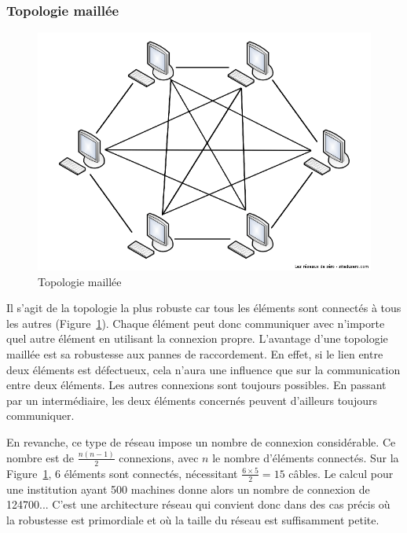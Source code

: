 \subsubsection{Topologie maillée}
\begin{figure}[h!]
  \centering
  \includegraphics[width=.4\textwidth]{images/topologies/topologieMaillee}
  \caption{Topologie maillée}
  \label{fig:topoMaillee}
\end{figure}

Il s'agit de la topologie la plus robuste car tous les éléments sont connectés à tous les autres (Figure~\ref{fig:topoMaillee}). Chaque élément peut donc communiquer avec n'importe quel autre élément en utilisant la connexion propre. L'avantage d'une topologie maillée est sa robustesse aux pannes de raccordement. En effet, si le lien entre deux éléments est défectueux, cela n'aura une influence que sur la communication entre deux éléments. Les autres connexions sont toujours possibles. En passant par un intermédiaire, les deux éléments concernés peuvent d'ailleurs toujours communiquer.

En revanche, ce type de réseau impose un nombre de connexion considérable. Ce nombre est de $\frac{n(n-1)}{2}$ connexions, avec $n$ le nombre d'éléments connectés. Sur la Figure~\ref{fig:topoMaillee}, 6 éléments sont connectés, nécessitant $\frac{6 \times 5}{2} = 15$ câbles. Le calcul pour une institution ayant 500 machines donne alors un nombre de connexion de \num{124700}... C'est une architecture réseau qui convient donc dans des cas précis où la robustesse est primordiale et où la taille du réseau est suffisamment petite.
